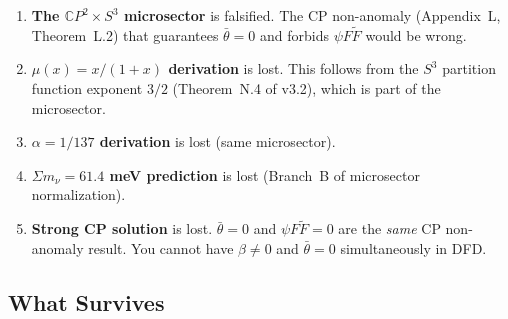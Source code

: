 \documentclass[11pt]{article}
\begin{document}
\begin{enumerate}
\item \textbf{The $\mathbb{C}P^2 \times S^3$ microsector} is
  falsified.  The CP non-anomaly (Appendix~L, Theorem~L.2) that
  guarantees $\bar{\theta} = 0$ and forbids $\psi F\tilde{F}$
  would be wrong.

\item \textbf{$\mu(x) = x/(1+x)$ derivation} is lost.  This
  follows from the $S^3$ partition function exponent $3/2$
  (Theorem~N.4 of v3.2), which is part of the microsector.

\item \textbf{$\alpha = 1/137$ derivation} is lost (same microsector).

\item \textbf{$\Sigma m_\nu = 61.4$ meV prediction} is lost
  (Branch~B of microsector normalization).

\item \textbf{Strong CP solution} is lost.  $\bar{\theta} = 0$
  and $\psi F\tilde{F} = 0$ are the \emph{same} CP non-anomaly
  result.  You cannot have $\beta \neq 0$ and $\bar{\theta} = 0$
  simultaneously in DFD.
\end{enumerate}

\subsection{What Survives}
\end{document}
